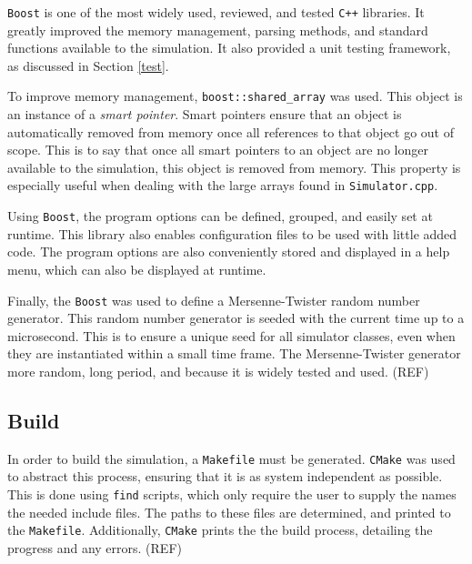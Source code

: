 \documentclass[a4paper,11pt]{article}
\begin{document}
\texttt{Boost} is one of the most widely used, reviewed, and tested \texttt{C++} libraries.  It greatly improved the memory management, parsing methods, and standard functions  available to the simulation.   It also provided a unit testing framework, as discussed in Section \ref{test}.  

To improve memory management, \texttt{boost::shared\_array} was used.  This object is an instance of a \emph{smart pointer}.  Smart pointers ensure that an object is automatically removed from memory once all references to that object go out of scope.  This is to say that once all smart pointers to an object are no longer available to the simulation, this object is removed from memory.  This property is especially useful when dealing with the large arrays found in \texttt{Simulator.cpp}.  

Using \texttt{Boost}, the program options can be defined, grouped, and easily set at runtime.  This library also enables configuration files to be used with little added code.  The program options are also conveniently stored and displayed in a help menu, which can also be displayed at runtime.  

Finally, the \texttt{Boost} was used to define a Mersenne-Twister random number generator.  This random number generator is seeded with the current time up to a microsecond.  This is to ensure a unique seed for all simulator classes, even when they are instantiated within a small time frame.  The Mersenne-Twister generator more random, long period, and because it is widely tested and used.  (REF)

\subsection{Build}

In order to build the simulation, a \texttt{Makefile} must be generated.  \texttt{CMake} was used to abstract this process, ensuring that it is as system independent as possible.   This is done using \texttt{find} scripts, which only require the user to supply the names the needed include files.  The paths to these files are determined, and printed to the \texttt{Makefile}.  Additionally, \texttt{CMake} prints the the build process, detailing the progress and any errors. (REF) %
\end{document}
